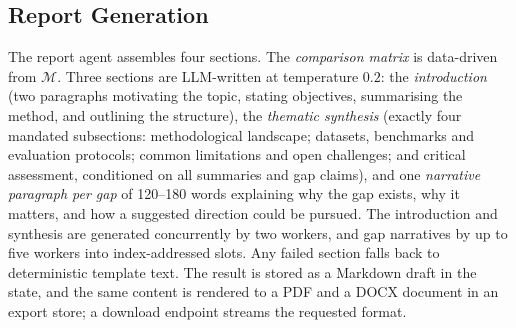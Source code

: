 \documentclass[conference]{IEEEtran}
\newcommand{\cM}{\mathcal{M}}
\begin{document}
\subsection{Report Generation}
The report agent assembles four sections. The \emph{comparison matrix} is data-driven from $\cM$. Three sections are LLM-written at temperature $0.2$: the \emph{introduction} (two paragraphs motivating the topic, stating objectives, summarising the method, and outlining the structure), the \emph{thematic synthesis} (exactly four mandated subsections: methodological landscape; datasets, benchmarks and evaluation protocols; common limitations and open challenges; and critical assessment, conditioned on all summaries and gap claims), and one \emph{narrative paragraph per gap} of 120--180 words explaining why the gap exists, why it matters, and how a suggested direction could be pursued. The introduction and synthesis are generated concurrently by two workers, and gap narratives by up to five workers into index-addressed slots. Any failed section falls back to deterministic template text. The result is stored as a Markdown draft in the state, and the same content is rendered to a PDF and a DOCX document in an export store; a download endpoint streams the requested format.
\end{document}
